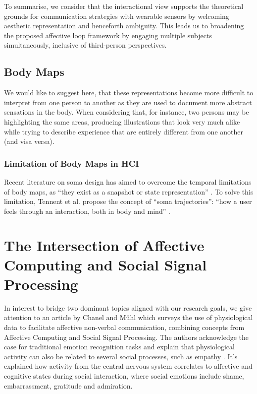 To summarise, we consider that the interactional view supports the theoretical grounds for communication strategies with wearable sensors by welcoming aesthetic representation and henceforth ambiguity. This leads us to broadening the proposed affective loop framework by engaging multiple subjects simultaneously, inclusive of third-person perspectives.

\subsection{Body Maps}

 We would like to suggest here, that these representations become more difficult to interpret from one person to another as they are used to document more abstract sensations in the body. When considering that, for instance, two persons may be highlighting the same areas, producing illustrations that look very much alike while trying to describe experience that are entirely different from one another (and visa versa).
 
 \subsubsection{Limitation of Body Maps in HCI}
 Recent literature on soma design has aimed to overcome the temporal limitations of body maps, as “they exist as a snapshot or state representation” \cite{tennent_articulating_2021}. To solve this limitation, Tennent et al. propose the concept of “soma trajectories”: “how a user feels through an interaction, both in body and mind” \cite{tennent_articulating_2021}.

\section{The Intersection of Affective Computing and Social Signal Processing}
\label{lit_reivew:ssp}

In interest to bridge two dominant topics aligned with our research goals, we give attention to an article by Chanel and Mühl \cite{chanel_connecting_2015} which surveys the use of physiological data to facilitate affective non-verbal communication, combining concepts from Affective Computing and Social Signal Processing. 
The authors acknowledge the case for traditional emotion recognition tasks and explain that physiological activity can also be related to several social processes, such as empathy \cite{levenson_empathy_1992}. It's explained how activity from the central nervous system correlates to affective and cognitive states during social interaction, where social emotions include shame, embarrassment, gratitude and admiration.

